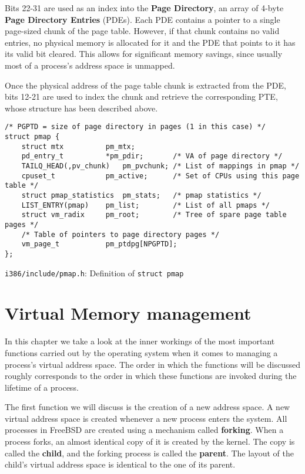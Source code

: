 \documentclass[shortabstract, english]{iithesis}
\begin{document}
Bits 22-31 are used as an index into the \textbf{Page Directory}, an array of
4-byte \textbf{Page Directory Entries} (PDEs). Each PDE contains a pointer to a
single page-sized chunk of the page table. However, if that chunk contains no
valid entries, no physical memory is allocated for it and the PDE that points to
it has its valid bit cleared. This allows for significant memory savings, since
usually most of a process's address space is unmapped.

Once the physical address of the page table chunk is extracted from the PDE,
bits 12-21 are used to index the chunk and retrieve the corresponding PTE, whose
structure has been described above.

\begin{listing}[H]
\begin{verbatim}
/* PGPTD = size of page directory in pages (1 in this case) */
struct pmap {
    struct mtx          pm_mtx;
    pd_entry_t          *pm_pdir;       /* VA of page directory */
    TAILQ_HEAD(,pv_chunk)   pm_pvchunk; /* List of mappings in pmap */
    cpuset_t            pm_active;      /* Set of CPUs using this page table */
    struct pmap_statistics  pm_stats;   /* pmap statistics */
    LIST_ENTRY(pmap)    pm_list;        /* List of all pmaps */
    struct vm_radix     pm_root;        /* Tree of spare page table pages */
    /* Table of pointers to page directory pages */
    vm_page_t           pm_ptdpg[NPGPTD];
};
\end{verbatim}
\caption{\texttt{i386/include/pmap.h}: Definition of \texttt{struct pmap}}
\end{listing}


\chapter{Virtual Memory management}

In this chapter we take a look at the inner workings of the most important
functions carried out by the operating system when it comes to managing a
process's virtual address space. The order in which the functions will be
discussed roughly corresponds to the order in which these functions are invoked
during the lifetime of a process.

The first function we will discuss is the creation of a new address space. A new
virtual address space is created whenever a new process enters the system. All
processes in FreeBSD are created using a mechanism called \textbf{forking}. When
a process forks, an almost identical copy of it is created by the kernel. The
copy is called the \textbf{child}, and the forking process is called the
\textbf{parent}. The layout of the child's virtual address space is identical to
the one of its parent.
\end{document}
